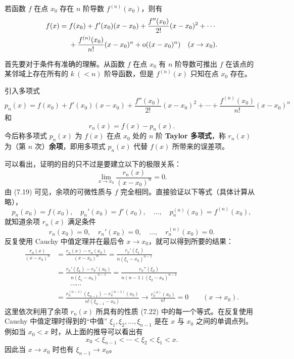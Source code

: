 \begin{xproposition}
若函数 $f$ 在点 $x_0$ 存在 $n$ 阶导数 $f^{(n)}(x_0)$，则有
\[
  \begin{aligned}
  f(x)={}&f(x_0)+f'(x_0)(x-x_0)+\frac{f''(x_0)}{2!}(x-x_0)^2+\cdots\\
  &+\frac{f^{(n)}(x_0)}{n!}(x-x_0)^n+\mathrm{o}((x-x_0)^n)\quad(x\to x_0).
  \end{aligned}
\]
\end{xproposition}
\begin{xproof}
首先要对于条件有准确的理解。从函数 $f$ 在点 $x_0$ 有 $n$ 阶导数可推出 $f$ 在该点的某邻域上存在所有的 $k\ (<n)$ 阶导函数，但是 $f^{(n)}(x)$ 只知在点 $x_0$ 存在。

引入多项式
\begin{equation}
  p_n(x)=f(x_0)+f'(x_0)(x-x_0)+\frac{f''(x_0)}{2!}(x-x_0)^2+\cdots+\frac{f^{(n)}(x_0)}{n!}(x-x_0)^n
  \tag{7.18}
\end{equation}
和
\begin{equation}
  r_n(x)=f(x)-p_n(x).
  \tag{7.19}
\end{equation}
今后称多项式 $p_n(x)$ 为 $f(x)$ 在点 $x_0$ 处的 $n$ 阶 \textbf{Taylor 多项式}，称 $r_n(x)$ 为（第 $n$ 次）\textbf{余项}，即用多项式 $p_n(x)$ 代替 $f(x)$ 所带来的误差项。

可以看出，证明的目的只不过是要建立以下的极限关系：
\begin{equation}
  \lim_{x\to x_0}\frac{r_n(x)}{(x-x_0)^n}=0.
  \tag{7.20}
\end{equation}
由 (7.19) 可见，余项的可微性质与 $f$ 完全相同。直接验证以下等式（具体计算从略），
\begin{equation}
  p_n(x_0)=f(x_0),\quad p_n'(x_0)=f'(x_0),\quad\ldots,\quad p_n^{(n)}(x_0)=f^{(n)}(x_0),
  \tag{7.21}
\end{equation}
就知道余项 $r_n(x)$ 满足条件
\begin{equation}
  r_n(x_0)=0,\quad r_n'(x_0)=0,\quad\ldots,\quad r_n^{(n)}(x_0)=0.
  \tag{7.22}
\end{equation}
反复使用 Cauchy 中值定理并在最后令 $x\to x_0$，就可以得到所要的结果：
\[
  \begin{aligned}
  \frac{r_n(x)}{(x-x_0)^n}
  &=\frac{r_n(x)-r_n(x_0)}{(x-x_0)^n}
   =\frac{r_n'(\xi_1)}{n(\xi_1-x_0)^{n-1}}\\
  &=\frac{r_n'(\xi_1)-r_n'(x_0)}{n(\xi_1-x_0)^{n-1}}
   =\frac{r_n''(\xi_2)}{n(n-1)(\xi_2-x_0)^{n-2}}\\
  &\qquad\cdots\cdots\\
  &=\frac{r_n^{(n-1)}(\xi_{n-1})-r_n^{(n-1)}(x_0)}{n!(\xi_{n-1}-x_0)}
  \longrightarrow\frac{r_n^{(n)}(x_0)}{n!}=0\qquad(x\to x_0).
  \end{aligned}
\]
这里依次利用了余项 $r_n(x)$ 所具有的性质 (7.22) 中的每一个等式。在反复使用 Cauchy 中值定理时得到的“中值” $\xi_1,\xi_2,\ldots,\xi_{n-1}$ 是在 $x$ 与 $x_0$ 之间的单调点列。例如当 $x_0<x$ 时，从上面的推导可以看出有
\[
  x_0<\xi_{n-1}<\cdots<\xi_2<\xi_1<x.
\]
因此当 $x\to x_0$ 时也有 $\xi_{n-1}\to x_0$。


\end{xproof}
